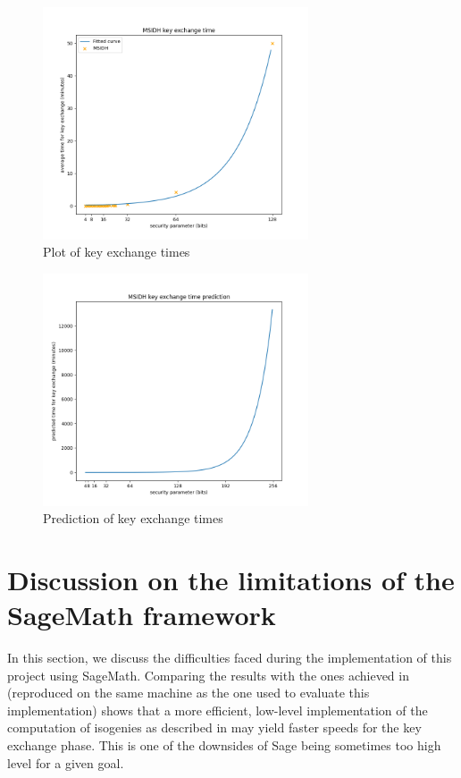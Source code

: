 \documentclass[a4paper,11pt,oneside]{report}
\begin{document}
    \begin{figure}
        \centering
        \includegraphics[width=0.7\textwidth]{img/Figure_1.png}
        \caption{Plot of key exchange times}
        \label{fig:ex1}
    \end{figure}

    \begin{figure}
        \centering
        \includegraphics[width=0.7\textwidth]{img/Figure_2.png}
        \caption{Prediction of key exchange times}
        \label{fig:ex2}
    \end{figure}

\section{Discussion on the limitations of the SageMath framework}
\label{discussion:limitations}

    In this section, we discuss the difficulties faced during the implementation of this project using SageMath. Comparing the results with the ones achieved in \cite{compression} (reproduced on the same machine as the one used to evaluate this implementation) shows that a more efficient, low-level implementation of the computation of isogenies as described in \cite{algorithms} may yield faster speeds for the key exchange phase. This is one of the downsides of Sage being sometimes too high level for a given goal.
\end{document}
